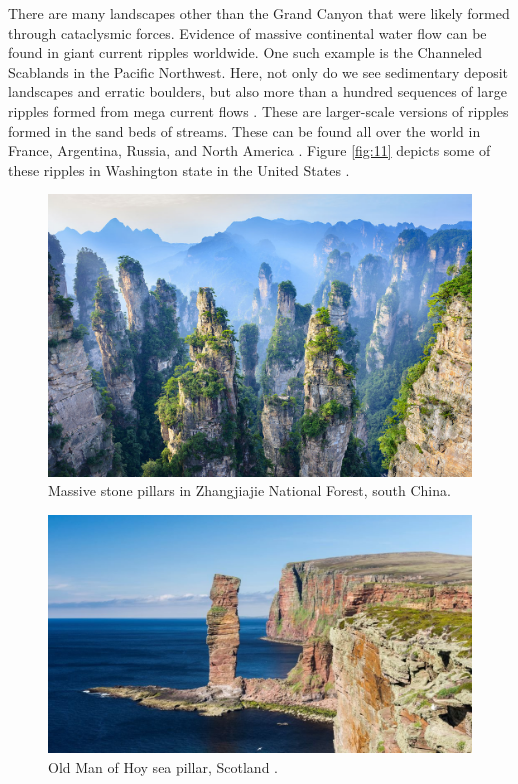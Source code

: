 \documentclass[10pt,twocolumn,letterpaper]{article}
\begin{document}
There are many landscapes other than the Grand Canyon that were likely formed through cataclysmic forces. Evidence of massive continental water flow can be found in giant current ripples worldwide. One such example is the Channeled Scablands in the Pacific Northwest. Here, not only do we see sedimentary deposit landscapes and erratic boulders, but also more than a hundred sequences of large ripples formed from mega current flows \cite{78,79}. These are larger-scale versions of ripples formed in the sand beds of streams. These can be found all over the world in France, Argentina, Russia, and North America \cite{81}. Figure \ref{fig:11} depicts some of these ripples in Washington state in the United States \cite{80}.

\begin{figure}[b]
\begin{center}
   \includegraphics[width=1\linewidth]{zhangjiajie.jpg}
\end{center}
   \caption{Massive stone pillars in Zhangjiajie National Forest, south China.}
\label{fig:12}
\label{fig:onecol}
\end{figure}

\begin{figure}[b]
\begin{center}
   \includegraphics[width=1\linewidth]{hoy.jpg}
\end{center}
   \caption{Old Man of Hoy sea pillar, Scotland \cite{83}.}
\label{fig:13}
\label{fig:onecol}
\end{figure}
\end{document}
